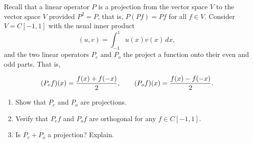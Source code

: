 Recall that a linear operator $P$ is a projection from the vector space $V$
to the vector space $V$ provided $P^2=P$, that is, $P(Pf) = Pf$ for all 
$f\in V$.  Consider $V=C[-1,1]$ with the usual inner product
\[ (u,v) = \int_{-1}^1 u(x) v(x)\,dx,\]
and the two linear operators $P_e$ and $P_o$ the project
a function onto their even and odd parts.  That is,

\[ (P_e f)(x) = {f(x) + f(-x) \over 2}, \qquad
   (P_o f)(x) = {f(x) - f(-x) \over 2}.\]

\begin{enumerate}
\item Show that $P_e$ and $P_o$ are projections.
\item Verify that $P_e f$ and $P_o f$ are orthogonal for any $f\in C[-1,1]$.
\item Is $P_e+P_o$ a projection?  Explain.
\end{enumerate}


